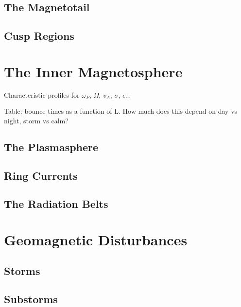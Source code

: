 \subsection{The Magnetotail}

\subsection{Cusp Regions}

\section{The Inner Magnetosphere}

Characteristic profiles for $\omega_P$, $\Omega$, $v_A$, $\sigma$, $\epsilon$...

Table: bounce times as a function of L. How much does this depend on day vs night, storm vs calm? 

\subsection{The Plasmasphere}

\subsection{Ring Currents}

\subsection{The Radiation Belts}

\section{Geomagnetic Disturbances}

\subsection{Storms}

\subsection{Substorms}






